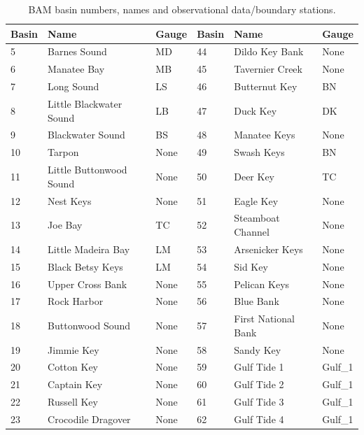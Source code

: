 \begin{table}[H]
\caption{
BAM basin numbers, names and observational data/boundary stations. 
} 
\centering
\begin{tabular}{ l l l | l l l }
\hline
Basin &   Name                   & Gauge & Basin &   Name           & Gauge\\
\hline
5     &  Barnes Sound            & MD    & 44 & Dildo Key Bank      & None\\
6     &  Manatee Bay             & MB    & 45 & Tavernier Creek     & None\\
7     &  Long Sound              & LS    & 46 & Butternut Key       & BN\\
8     &  Little Blackwater Sound & LB    & 47 & Duck Key            & DK\\
9     &  Blackwater Sound        & BS    & 48 & Manatee Keys        & None\\
10    &  Tarpon                  & None  & 49 & Swash Keys          & BN\\
11    &  Little Buttonwood Sound & None  & 50 & Deer Key            & TC\\
12    &  Nest Keys               & None  & 51 & Eagle Key           & None\\
13    &  Joe Bay                 & TC    & 52 & Steamboat Channel   & None\\
14    &  Little Madeira Bay      & LM    & 53 & Arsenicker Keys     & None\\
15    &  Black Betsy Keys        & LM    & 54 & Sid Key             & None\\
16    &  Upper Cross Bank        & None  & 55 & Pelican Keys        & None\\
17    &  Rock Harbor             & None  & 56 & Blue Bank           & None\\
18    &  Buttonwood Sound        & None  & 57 & First National Bank & None\\
19    &  Jimmie Key              & None  & 58 & Sandy Key           & None\\
20    &  Cotton Key              & None  & 59 & Gulf Tide 1         & Gulf\_1\\
21    &  Captain Key             & None  & 60 & Gulf Tide 2         & Gulf\_1\\
22    &  Russell Key             & None  & 61 & Gulf Tide 3         & Gulf\_1\\
23    &  Crocodile Dragover      & None  & 62 & Gulf Tide 4         & Gulf\_1\\

\end{tabular}
\end{table}
